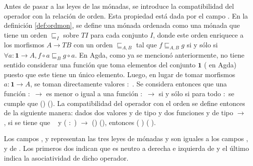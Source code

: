Antes de pasar a las leyes de las mónadas, se introduce la compatibilidad del operador \AgdaField{$\gg=$} con la relación de orden. Esta propiedad está dada por el campo . En la definición \ref{def:ordmon}, se define una mónada ordenada como una mónada que tiene un orden $\sqsubseteq_I$ sobre $\mathit{T} I$ para cada conjunto $I$, donde este orden enriquece a los morfismos $A \rightarrow \mathit{T} B$ con un orden $\sqsubseteq_{A,B}$ tal que $f \sqsubseteq_{A,B} g$ si y sólo si $\forall a: \mathbf{1} \rightarrow A, f \circ a \sqsubseteq_B g \circ a$. En Agda, como ya se mencionó anteriormente, no tiene sentido considerar una función que toma elementos del conjunto $\mathbf{1}$ (\AgdaDatatype{$\top$} en Agda) puesto que este tiene un único elemento. Luego, en lugar de tomar morfismos $a : \mathbf{1} \rightarrow A$, se toman directamente valores  $:$ . Se considera entonces que una función  $:$  $\rightarrow$  es menor o igual a una función  $:$  $\rightarrow$  si y sólo si para todo  $:$  se cumple que ()  (). La compatibilidad del operador \AgdaField{$\gg=$} con el orden  se define entonces de la siguiente manera: dados dos valores  y  de tipo \hbox{} y dos funciones  y  de tipo  $\rightarrow$ , si se tiene que \hbox{  } y \AgdaSymbol{$\forall$} ( $:$ ) $\rightarrow$ ()  (), entonces ( \AgdaField{$\gg=$} )  ( \AgdaField{$\gg=$} ).

Los campos ,  y  representan las tres leyes de mónadas y son iguales a los campos ,  y  de . Los primeros dos indican que  es neutro a derecha e izquierda de \AgdaField{$\gg=$} y el último indica la asociatividad de dicho operador.


